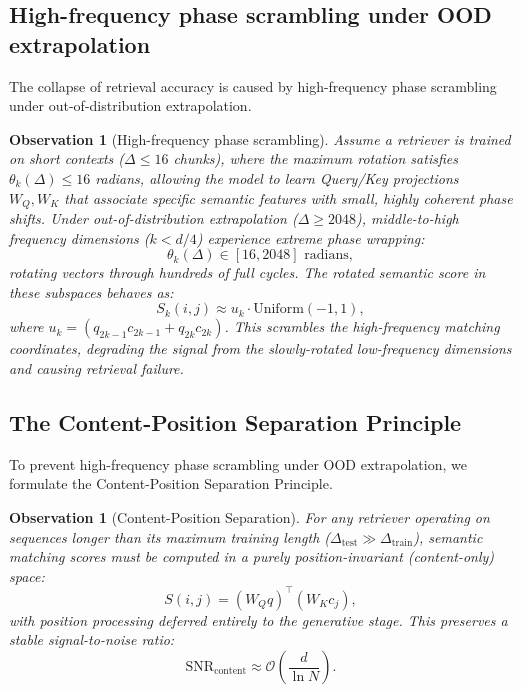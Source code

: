 \documentclass[preprint,12pt]{elsarticle}
\newtheorem{observation}[theorem]{Observation}
\begin{document}
\subsection{High-frequency phase scrambling under OOD extrapolation}

The collapse of retrieval accuracy is caused by high-frequency phase scrambling under out-of-distribution extrapolation.

\begin{observation}[High-frequency phase scrambling]
Assume a retriever is trained on short contexts ($\Delta \leq 16$ chunks), where the maximum rotation satisfies $\theta_k(\Delta) \leq 16$ radians, allowing the model to learn Query/Key projections $W_Q, W_K$ that associate specific semantic features with small, highly coherent phase shifts. Under out-of-distribution extrapolation ($\Delta \geq 2048$), middle-to-high frequency dimensions ($k < d/4$) experience extreme phase wrapping:
\begin{equation}
\theta_k(\Delta) \in [16, 2048] \text{ radians},
\end{equation}
rotating vectors through hundreds of full cycles. The rotated semantic score in these subspaces behaves as:
\begin{equation}
S_k(i, j) \approx u_k \cdot \text{Uniform}(-1, 1),
\end{equation}
where $u_k = (q_{2k-1} c_{2k-1} + q_{2k} c_{2k})$. This scrambles the high-frequency matching coordinates, degrading the signal from the slowly-rotated low-frequency dimensions and causing retrieval failure.
\end{observation}

\subsection{The Content-Position Separation Principle}

To prevent high-frequency phase scrambling under OOD extrapolation, we formulate the Content-Position Separation Principle.

\begin{observation}[Content-Position Separation]
For any retriever operating on sequences longer than its maximum training length ($\Delta_{\text{test}} \gg \Delta_{\text{train}}$), semantic matching scores must be computed in a purely position-invariant (content-only) space:
\begin{equation}
S(i, j) = (W_Q q)^\top (W_K c_j),
\end{equation}
with position processing deferred entirely to the generative stage. This preserves a stable signal-to-noise ratio:
\begin{equation}
\text{SNR}_{\text{content}} \approx \mathcal{O}\left(\frac{d}{\ln N}\right).
\end{equation}
\end{observation}
\end{document}
